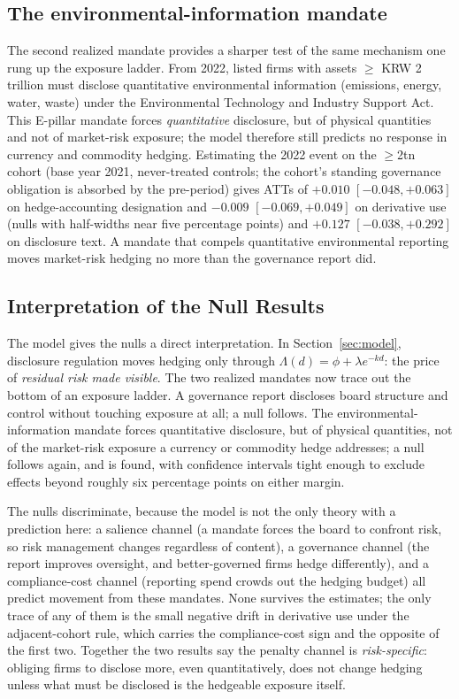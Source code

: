 \documentclass[11pt,a4paper]{article}
\begin{document}
\subsection{The environmental-information mandate}
\label{sec:epillar}

The second realized mandate provides a sharper test of the same mechanism one rung up the exposure ladder. From 2022, listed firms with assets $\ge$ KRW 2 trillion must disclose quantitative environmental information (emissions, energy, water, waste) under the Environmental Technology and Industry Support Act. This E-pillar mandate forces \emph{quantitative} disclosure, but of physical quantities and not of market-risk exposure; the model therefore still predicts no response in currency and commodity hedging. Estimating the 2022 event on the $\ge$2tn cohort (base year 2021, never-treated controls; the cohort's standing governance obligation is absorbed by the pre-period) gives ATTs of $+0.010$ $[-0.048,+0.063]$ on hedge-accounting designation and $-0.009$ $[-0.069,+0.049]$ on derivative use (nulls with half-widths near five percentage points) and $+0.127$ $[-0.038,+0.292]$ on disclosure text. A mandate that compels quantitative environmental reporting moves market-risk hedging no more than the governance report did.

\subsection{Interpretation of the Null Results}
\label{sec:execinterp}

The model gives the nulls a direct interpretation. In Section~\ref{sec:model}, disclosure regulation moves hedging only through $\Lambda(d)=\phi+\lambda e^{-kd}$: the price of \emph{residual risk made visible}. The two realized mandates now trace out the bottom of an exposure ladder. A governance report discloses board structure and control without touching exposure at all; a null follows. The environmental-information mandate forces quantitative disclosure, but of physical quantities, not of the market-risk exposure a currency or commodity hedge addresses; a null follows again, and is found, with confidence intervals tight enough to exclude effects beyond roughly six percentage points on either margin.

The nulls discriminate, because the model is not the only theory with a prediction here: a salience channel (a mandate forces the board to confront risk, so risk management changes regardless of content), a governance channel (the report improves oversight, and better-governed firms hedge differently), and a compliance-cost channel (reporting spend crowds out the hedging budget) all predict movement from these mandates. None survives the estimates; the only trace of any of them is the small negative drift in derivative use under the adjacent-cohort rule, which carries the compliance-cost sign and the opposite of the first two. Together the two results say the penalty channel is \emph{risk-specific}: obliging firms to disclose more, even quantitatively, does not change hedging unless what must be disclosed is the hedgeable exposure itself.
\end{document}
